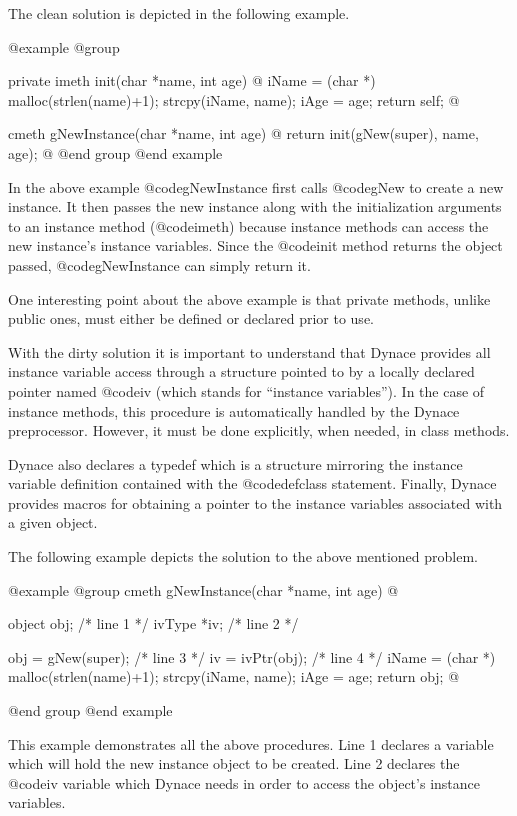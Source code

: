 The clean solution is depicted in the following example.

@example
@group

private imeth  init(char *name, int age)
@{
        iName = (char *) malloc(strlen(name)+1);
        strcpy(iName, name);
        iAge = age;
        return self;
@}

cmeth   gNewInstance(char *name, int age)
@{
        return init(gNew(super), name, age);
@}
@end group
@end example

In the above example @code{gNewInstance} first calls @code{gNew} to
create a new instance.  It then passes the new instance along with the
initialization arguments to an instance method (@code{imeth}) because
instance methods can access the new instance's instance variables.
Since the @code{init} method returns the object passed, @code{gNewInstance}
can simply return it.

One interesting point about the above example is that private methods,
unlike public ones, must either be defined or declared prior to use.

With the dirty solution it is important to understand that Dynace
provides all instance variable access through a structure pointed to
by a locally declared pointer named @code{iv} (which stands for
``instance variables'').  In the case of instance methods, this
procedure is automatically handled by the Dynace preprocessor.
However, it must be done explicitly, when needed, in class methods.

Dynace also declares a typedef which is a structure mirroring the
instance variable definition contained with the @code{defclass}
statement.  Finally, Dynace provides macros for obtaining
a pointer to the instance variables associated with a given object.

The following example depicts the solution to the above mentioned problem.

@example
@group
cmeth   gNewInstance(char *name, int age)
@{
        object  obj;                    /*  line 1  */
        ivType  *iv;                    /*  line 2  */

        obj = gNew(super);              /*  line 3  */
        iv = ivPtr(obj);                /*  line 4  */
        iName = (char *) malloc(strlen(name)+1);
        strcpy(iName, name);
        iAge = age;
        return obj;
@}
@end group
@end example


This example demonstrates all the above procedures.  Line 1 declares a
variable which will hold the new instance object to be created.  Line 2
declares the @code{iv} variable which Dynace needs in order to access
the object's instance variables.

